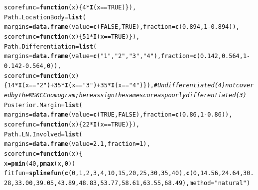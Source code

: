 \documentclass{article}\usepackage[]{graphicx}\usepackage[]{color}
\makeatletter
\newcommand{\hlnum}[1]{\textcolor[rgb]{0.686,0.059,0.569}{#1}}%
\newcommand{\hlstr}[1]{\textcolor[rgb]{0.192,0.494,0.8}{#1}}%
\newcommand{\hlcom}[1]{\textcolor[rgb]{0.678,0.584,0.686}{\textit{#1}}}%
\newcommand{\hlopt}[1]{\textcolor[rgb]{0,0,0}{#1}}%
\newcommand{\hlstd}[1]{\textcolor[rgb]{0.345,0.345,0.345}{#1}}%
\newcommand{\hlkwa}[1]{\textcolor[rgb]{0.161,0.373,0.58}{\textbf{#1}}}%
\newcommand{\hlkwb}[1]{\textcolor[rgb]{0.69,0.353,0.396}{#1}}%
\newcommand{\hlkwc}[1]{\textcolor[rgb]{0.333,0.667,0.333}{#1}}%
\newcommand{\hlkwd}[1]{\textcolor[rgb]{0.737,0.353,0.396}{\textbf{#1}}}%
\newenvironment{kframe}{%
 \def\at@end@of@kframe{}%
 \ifinner\ifhmode%
  \def\at@end@of@kframe{\end{minipage}}%
  \begin{minipage}{\columnwidth}%
 \fi\fi%
 \def\FrameCommand##1{\hskip\@totalleftmargin \hskip-\fboxsep
 \colorbox{shadecolor}{##1}\hskip-\fboxsep
     \hskip-\linewidth \hskip-\@totalleftmargin \hskip\columnwidth}%
 \MakeFramed {\advance\hsize-\width
   \@totalleftmargin\z@ \linewidth\hsize
   \@setminipage}}%
 {\par\unskip\endMakeFramed%
 \at@end@of@kframe}
\newenvironment{knitrout}{}{} %
\makeatother
\begin{document}
\begin{knitrout}
\begin{kframe}
\begin{alltt}
                \hlkwc{scorefunc} \hlstd{=} \hlkwa{function}\hlstd{(}\hlkwc{x}\hlstd{) \{} \hlnum{4}\hlopt{*}\hlkwd{I}\hlstd{(x} \hlopt{==} \hlnum{TRUE}\hlstd{) \}),}
        \hlkwc{Path.LocationBody} \hlstd{=} \hlkwd{list}\hlstd{(}
                \hlkwc{margins} \hlstd{=} \hlkwd{data.frame}\hlstd{(}\hlkwc{value} \hlstd{=} \hlkwd{c}\hlstd{(}\hlnum{FALSE}\hlstd{,} \hlnum{TRUE}\hlstd{),} \hlkwc{fraction} \hlstd{=} \hlkwd{c}\hlstd{(}\hlnum{0.894}\hlstd{,} \hlnum{1}\hlopt{-}\hlnum{0.894}\hlstd{)),}
                \hlkwc{scorefunc} \hlstd{=} \hlkwa{function}\hlstd{(}\hlkwc{x}\hlstd{) \{} \hlnum{51}\hlopt{*}\hlkwd{I}\hlstd{(x} \hlopt{==} \hlnum{TRUE}\hlstd{) \}),}
        \hlkwc{Path.Differentiation} \hlstd{=} \hlkwd{list}\hlstd{(}
                \hlkwc{margins} \hlstd{=} \hlkwd{data.frame}\hlstd{(}\hlkwc{value} \hlstd{=} \hlkwd{c}\hlstd{(}\hlstr{"1"}\hlstd{,} \hlstr{"2"}\hlstd{,} \hlstr{"3"}\hlstd{,} \hlstr{"4"}\hlstd{),} \hlkwc{fraction} \hlstd{=} \hlkwd{c}\hlstd{(}\hlnum{0.142}\hlstd{,} \hlnum{0.564}\hlstd{,} \hlnum{1}\hlopt{-}\hlnum{0.142}\hlopt{-}\hlnum{0.564}\hlstd{,} \hlnum{0}\hlstd{)),}
                \hlkwc{scorefunc} \hlstd{=} \hlkwa{function}\hlstd{(}\hlkwc{x}\hlstd{) \{} \hlnum{14}\hlopt{*}\hlkwd{I}\hlstd{(x} \hlopt{==} \hlstr{"2"}\hlstd{)} \hlopt{+} \hlnum{35}\hlopt{*}\hlkwd{I}\hlstd{(x} \hlopt{==} \hlstr{"3"}\hlstd{)} \hlopt{+} \hlnum{35}\hlopt{*}\hlkwd{I}\hlstd{(x} \hlopt{==} \hlstr{"4"}\hlstd{) \}),}          \hlcom{# Undifferentiated (4) not covered by the MSKCC nomogram; here assign the same score as poorly differentiated (3)}
        \hlkwc{Posterior.Margin} \hlstd{=} \hlkwd{list}\hlstd{(}
                \hlkwc{margins} \hlstd{=} \hlkwd{data.frame}\hlstd{(}\hlkwc{value} \hlstd{=} \hlkwd{c}\hlstd{(}\hlnum{TRUE}\hlstd{,} \hlnum{FALSE}\hlstd{),} \hlkwc{fraction} \hlstd{=} \hlkwd{c}\hlstd{(}\hlnum{0.86}\hlstd{,} \hlnum{1}\hlopt{-}\hlnum{0.86}\hlstd{)),}
                \hlkwc{scorefunc} \hlstd{=} \hlkwa{function}\hlstd{(}\hlkwc{x}\hlstd{) \{} \hlnum{22}\hlopt{*}\hlkwd{I}\hlstd{(x} \hlopt{==} \hlnum{TRUE}\hlstd{) \}),}
        \hlkwc{Path.LN.Involved} \hlstd{=} \hlkwd{list}\hlstd{(}
                \hlkwc{margins} \hlstd{=} \hlkwd{data.frame}\hlstd{(}\hlkwc{value} \hlstd{=} \hlnum{2.1}\hlstd{,} \hlkwc{fraction} \hlstd{=} \hlnum{1}\hlstd{),}
                \hlkwc{scorefunc} \hlstd{=} \hlkwa{function}\hlstd{(}\hlkwc{x}\hlstd{) \{}
                        \hlstd{x} \hlkwb{=} \hlkwd{pmin}\hlstd{(}\hlnum{40}\hlstd{,} \hlkwd{pmax}\hlstd{(x,} \hlnum{0}\hlstd{))}
                        \hlstd{fitfun} \hlkwb{=} \hlkwd{splinefun}\hlstd{(}\hlkwd{c}\hlstd{(}\hlnum{0}\hlstd{,} \hlnum{1}\hlstd{,} \hlnum{2}\hlstd{,} \hlnum{3}\hlstd{,} \hlnum{4}\hlstd{,} \hlnum{10}\hlstd{,} \hlnum{15}\hlstd{,} \hlnum{20}\hlstd{,} \hlnum{25}\hlstd{,} \hlnum{30}\hlstd{,} \hlnum{35}\hlstd{,} \hlnum{40}\hlstd{),} \hlkwd{c}\hlstd{(}\hlnum{0}\hlstd{,} \hlnum{14.56}\hlstd{,} \hlnum{24.64}\hlstd{,} \hlnum{30.28}\hlstd{,} \hlnum{33.00}\hlstd{,} \hlnum{39.05}\hlstd{,} \hlnum{43.89}\hlstd{,} \hlnum{48.83}\hlstd{,} \hlnum{53.77}\hlstd{,} \hlnum{58.61}\hlstd{,} \hlnum{63.55}\hlstd{,} \hlnum{68.49}\hlstd{),} \hlkwc{method} \hlstd{=} \hlstr{"natural"}\hlstd{)}

\end{alltt}
\end{kframe}
\end{knitrout}
\end{document}
